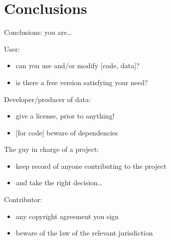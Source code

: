 \documentclass[10pt,xcolor=svgnames]{beamer}
\begin{document}
\section[]{Conclusions}
\begin{frame}{Conclusions: you are\ldots}

  \begin{block}{User:}
    \begin{itemize}
      \item can you use and/or modify [code, data]?
      \item is there a free version satisfying your need?
    \end{itemize}
  \end{block}

  \begin{block}{Developer/producer of data:}
    \begin{itemize}
      \item {} give a license, prior to anything!
      \item \hspace{0em}[for code] beware of dependencies
    \end{itemize}
  \end{block}

  \begin{block}{The guy in charge of a project:}
    \begin{itemize}
      \item keep record of anyone contributing to the project
      \item and take the right decision\ldots
    \end{itemize}
  \end{block}

  \begin{block}{Contributor:}
    \begin{itemize}
      \item {} any copyright agreement you sign
      \item beware of the law of the relevant jurisdiction
    \end{itemize}
  \end{block}

\end{frame}
\end{document}
